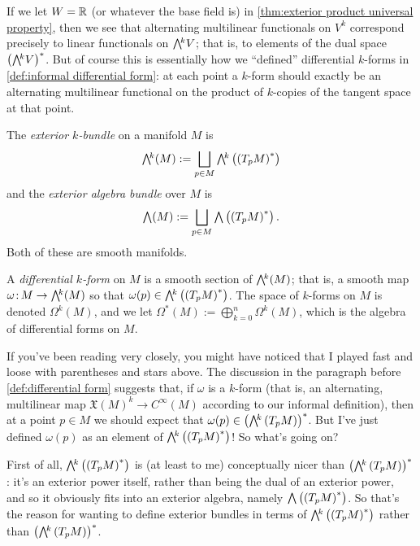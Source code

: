 If we let $W = \mathbb{R}$ (or whatever the base field is) in \cref{thm:exterior product universal property}, then we see that alternating multilinear functionals on $V^k$ correspond precisely to linear functionals on $\ext{k}V$; that is, to elements of the dual space $\left(\ext{k}V\right)^\ast$. But of course this is essentially how we ``defined'' differential $k$-forms in \cref{def:informal differential form}: at each point a $k$-form should exactly be an alternating multilinear functional on the product of $k$-copies of the tangent space at that point.

\begin{definition}\label{def:differential form}
	The \emph{exterior $k$-bundle} on a manifold $M$ is
	\[
		\ext{k}(M) := \bigsqcup_{p \in M} \ext{k}\left(\left(T_pM\right)^\ast\right)
	\]
	and the \emph{exterior algebra bundle} over $M$ is
	\[
		\ext{} (M) := \bigsqcup_{p \in M} \ext{} \left(\left(T_pM\right)^\ast\right).
	\]
	Both of these are smooth manifolds.
	
	A \emph{differential $k$-form} on $M$ is a smooth section of $\ext{k}(M)$; that is, a smooth map $\omega\from M \to \ext{k}(M)$ so that $\omega(p) \in \ext{k}\left(\left(T_pM\right)^\ast\right)$. The space of $k$-forms on $M$ is denoted $\Omega^k(M)$, and we let $\Omega^\ast(M) := \displaystyle \bigoplus_{k=0}^n \Omega^k(M)$, which is the algebra of differential forms on $M$.
\end{definition}

If you've been reading very closely, you might have noticed that I played fast and loose with parentheses and stars above. The discussion in the paragraph before \cref{def:differential form} suggests that, if $\omega$ is a $k$-form (that is, an alternating, multilinear map $\mathfrak{X}(M)^k \to C^\infty(M)$ according to our informal definition), then at a point $p \in M$ we should expect that $\omega(p) \in \left(\ext{k}\left(T_pM\right)\right)^\ast$. But I've just defined $\omega(p)$ as an element of $\ext{k}\left(\left(T_pM\right)^\ast \right)$! So what's going on?

First of all, $\ext{k}\left(\left(T_pM\right)^\ast \right)$ is (at least to me) conceptually nicer than $\left(\ext{k}\left(T_pM\right)\right)^\ast$: it's an exterior power itself, rather than being the dual of an exterior power, and so it obviously fits into an exterior algebra, namely $\ext{}\left(\left(T_pM\right)^\ast\right)$. So that's the reason for wanting to define exterior bundles in terms of $\ext{k}\left(\left(T_pM\right)^\ast\right)$ rather than $\left(\ext{k}\left(T_pM\right)\right)^\ast$.


